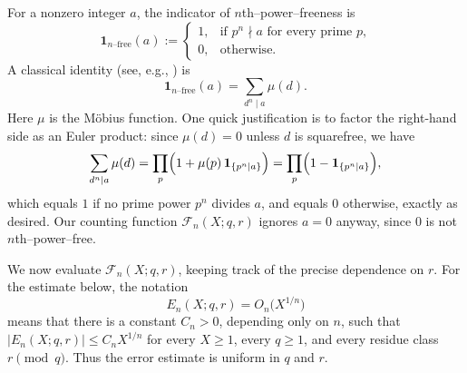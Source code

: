 \documentclass[12pt,a4paper,oneside]{amsart}
\theoremstyle{definition}
\begin{document}
For a nonzero integer $a$, the indicator of $n$th--power--freeness is
\[
\mathbf 1_{\text{$n$--free}}(a)
:=
\begin{cases}
1,&\text{if $p^n\nmid a$ for every prime $p$,}\\
0,&\text{otherwise.}
\end{cases}
\]
A classical identity (see, e.g., \cite[Ch.\,III]{Ten15}) is
\begin{equation}\label{eq:mobius-nfree}
\mathbf 1_{\text{$n$--free}}(a)=\sum_{d^n\mid a}\mu(d).
\end{equation}
Here $\mu$ is the M\"obius function.  One quick justification is to factor the right-hand side as an Euler product: since $\mu(d)=0$ unless $d$ is squarefree, we have
\[
\sum_{d^n\mid a}\mu(d)
=\prod_{p}\Bigl(1+\mu(p)\,\mathbf 1_{\{p^n\mid a\}}\Bigr)
=\prod_{p}\Bigl(1-\mathbf 1_{\{p^n\mid a\}}\Bigr),
\]
which equals $1$ if no prime power $p^n$ divides $a$, and equals $0$ otherwise, exactly as desired. Our counting function $\mathcal F_n(X;q,r)$ ignores $a=0$ anyway, since $0$ is not $n$th--power--free.

We now evaluate $\mathcal F_n(X;q,r)$, keeping track of the precise dependence on $r$.
For the estimate below, the notation
\[
E_n(X;q,r)=O_n\!\bigl(X^{1/n}\bigr)
\]
means that there is a constant $C_n>0$, depending only on $n$, such that
$|E_n(X;q,r)|\le C_nX^{1/n}$ for every $X\ge1$, every $q\ge1$, and every residue class
$r\pmod q$. Thus the error estimate is uniform in $q$ and $r$.
\end{document}
